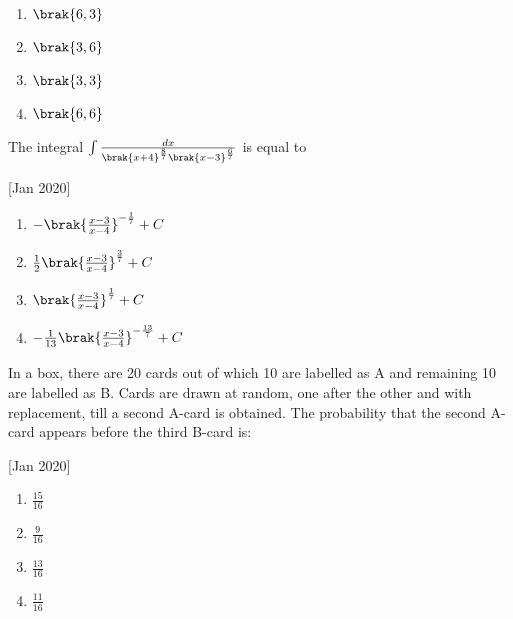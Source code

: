         \begin{multicols}{4}
            \begin{enumerate}
                \item $\brak{6, 3}$
                \item $\brak{3, 6}$
                \item $\brak{3, 3}$
                \item $\brak{6, 6}$
            \end{enumerate}
        \end{multicols}

    \item The integral $\int\frac{dx}{\brak{x+4}^{\frac{8}{7}}\brak{x-3}^{\frac{6}{7}}}$ is equal to
    
    \hfill[Jan 2020]

		\begin{multicols}{4}
			\begin{enumerate}
				\item $-\brak{\frac{x-3}{x-4}}^{-\frac{1}{7}}+C$
				\item $\frac{1}{2}\brak{\frac{x-3}{x-4}}^{\frac{3}{7}}+C$
				\item $\brak{\frac{x-3}{x-4}}^{\frac{1}{7}}+C$
				\item $-\frac{1}{13}\brak{\frac{x-3}{x-4}}^{-\frac{13}{7}}+C$
			\end{enumerate}
		\end{multicols}

    \item In a box, there are 20 cards out of which 10 are labelled as A and remaining 10 are labelled as B. Cards are drawn at random, one after the other and with replacement, till a second A-card is obtained. The probability that the second A-card appears before the third B-card is:
    
    \hfill[Jan 2020]

		\begin{multicols}{4}
			\begin{enumerate}
				\item $\frac{15}{16}$
				\item $\frac{9}{16}$
				\item $\frac{13}{16}$
				\item $\frac{11}{16}$
			\end{enumerate}
		\end{multicols}

